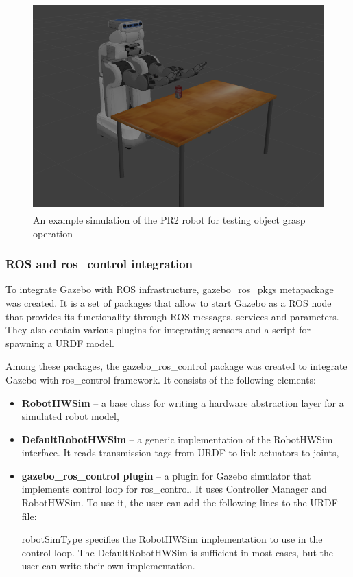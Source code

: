 \documentclass[english,inz,shortabstract]{iithesis}
\newcommand{\val}[1]{\textbf{\textsf{#1}}}
\begin{document}
	\begin{figure}[ht]
		\centering 
		\captionsetup{margin=2.5cm} 
		\includegraphics[height=8cm]{img/gazebo_pr2.png}
		\caption{An example simulation of the PR2 robot for testing object grasp operation}
		\label{fig:gazebo_pr2}
	\end{figure}

	\subsubsection{ROS and ros\_control integration}
	To integrate Gazebo with ROS infrastructure, \textsf{gazebo\_ros\_pkgs} metapackage was created. It is a set of packages that allow to start Gazebo as a ROS node that provides its functionality through ROS messages, services and parameters. They also contain various plugins for integrating sensors and a script for spawning a URDF model.
	
	Among these packages, the \textsf{gazebo\_ros\_control} package was created to integrate Gazebo with \textsf{ros\_control} framework. It consists of the following elements:
	\begin{itemize}
		\item \val{RobotHWSim} -- a base class for writing a hardware abstraction layer for a simulated robot model,
		\item \val{DefaultRobotHWSim} -- a generic implementation of the RobotHWSim interface. It reads transmission tags from URDF to link actuators to joints,
		\item \textbf{\textsf{gazebo\_ros\_control} plugin} -- a plugin for Gazebo simulator that implements control loop for ros\_control. It uses Controller Manager and RobotHWSim. To use it, the user can add the following lines to the URDF file:
		
		\textsf{robotSimType} specifies the RobotHWSim implementation to use in the control loop. The \mbox{DefaultRobotHWSim} is sufficient in most cases, but the user can write their own implementation.
	\end{itemize}
\end{document}
